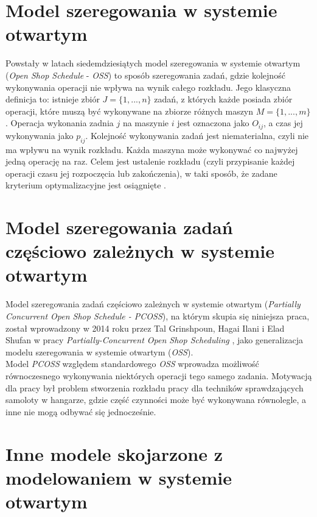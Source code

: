 \documentclass[brudnopis]{xmgr}
\begin{document}
\section{Model szeregowania w systemie otwartym}
\medskip

Powstały w latach siedemdziesiątych model szeregowania w systemie otwartym (\emph{Open Shop Schedule} - \emph{OSS}) to sposób szeregowania zadań, gdzie kolejność wykonywania operacji nie wpływa na wynik całego rozkładu. Jego klasyczna definicja to: istnieje zbiór $J=\{1, ..., n\}$ zadań, z których każde posiada zbiór operacji, które muszą być wykonywane na zbiorze różnych maszyn $M=\{1, ..., m\}$. Operacja wykonania zadnia $j$ na maszynie $i$ jest oznaczona jako $O_{ij}$, a czas jej wykonywania jako $p_{ij}$.
Kolejność wykonywania zadań jest niematerialna, czyli nie ma wpływu na wynik rozkładu. Każda maszyna może wykonywać co najwyżej jedną operację na raz. Celem jest ustalenie rozkładu (czyli przypisanie każdej operacji czasu jej rozpoczęcia lub zakończenia), w taki sposób, że zadane kryterium optymalizacyjne jest osiągnięte \cite{ahmadian2020four}.


\section{Model szeregowania zadań częściowo zależnych w systemie otwartym}

Model szeregowania zadań częściowo zależnych w systemie otwartym (\emph{Partially Concurrent Open Shop Schedule - PCOSS}), na którym skupia się niniejsza praca, został wprowadzony w 2014 roku przez Tal Grinshpoun, Hagai Ilani i Elad Shufan w pracy \emph{Partially-Concurrent Open Shop Scheduling} \cite{grinshpoun2014partially}, jako generalizacja modelu szeregowania w systemie otwartym (\emph{OSS}).\\
Model \emph{PCOSS} względem standardowego \emph{OSS} wprowadza możliwość równoczesnego wykonywania niektórych operacji tego samego zadania. Motywacją dla pracy był problem stworzenia rozkładu pracy dla techników sprawdzających samoloty w hangarze, gdzie część czynności może być wykonywana równolegle, a inne nie mogą odbywać się jednocześnie.


\section{Inne modele skojarzone z modelowaniem w systemie otwartym}
\end{document}
